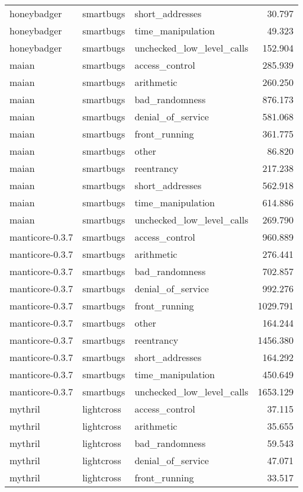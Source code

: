 \begin{tabular}[t]{lllr}
honeybadger & smartbugs & short\_addresses & 30.797\\
honeybadger & smartbugs & time\_manipulation & 49.323\\
honeybadger & smartbugs & unchecked\_low\_level\_calls & 152.904\\
\addlinespace
maian & smartbugs & access\_control & 285.939\\
maian & smartbugs & arithmetic & 260.250\\
maian & smartbugs & bad\_randomness & 876.173\\
maian & smartbugs & denial\_of\_service & 581.068\\
maian & smartbugs & front\_running & 361.775\\
\addlinespace
maian & smartbugs & other & 86.820\\
maian & smartbugs & reentrancy & 217.238\\
maian & smartbugs & short\_addresses & 562.918\\
maian & smartbugs & time\_manipulation & 614.886\\
maian & smartbugs & unchecked\_low\_level\_calls & 269.790\\
\addlinespace
manticore-0.3.7 & smartbugs & access\_control & 960.889\\
manticore-0.3.7 & smartbugs & arithmetic & 276.441\\
manticore-0.3.7 & smartbugs & bad\_randomness & 702.857\\
manticore-0.3.7 & smartbugs & denial\_of\_service & 992.276\\
manticore-0.3.7 & smartbugs & front\_running & 1029.791\\
\addlinespace
manticore-0.3.7 & smartbugs & other & 164.244\\
manticore-0.3.7 & smartbugs & reentrancy & 1456.380\\
manticore-0.3.7 & smartbugs & short\_addresses & 164.292\\
manticore-0.3.7 & smartbugs & time\_manipulation & 450.649\\
manticore-0.3.7 & smartbugs & unchecked\_low\_level\_calls & 1653.129\\
\addlinespace
mythril & lightcross & access\_control & 37.115\\
mythril & lightcross & arithmetic & 35.655\\
mythril & lightcross & bad\_randomness & 59.543\\
mythril & lightcross & denial\_of\_service & 47.071\\
mythril & lightcross & front\_running & 33.517\\

\end{tabular}
